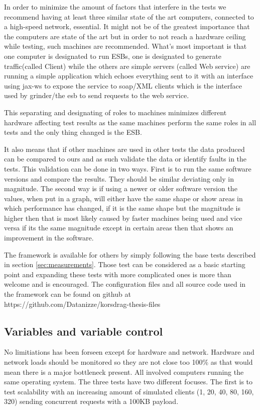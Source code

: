 In order to minimize the amount of factors that interfere in the tests we recommend having at least three similar state of the art computers, connected to a high-speed network, essential.
It might not be of the greatest importance that the computers are state of the art but in order to not reach a hardware ceiling while testing, such machines are recommended. 
What's most important is that one computer is designated to run ESBs, one is designated to generate traffic(called Client) while the others are simple servers (called Web service) are running a simple application which echoes everything sent to it with an interface using jax-ws to expose the service to soap/XML clients which is the interface used by grinder/the esb to send requests to the web service.

This separating and designating of roles to machines minimizes different hardware affecting test results as the same machines perform the same roles in all tests and the only thing changed is the ESB. 

It also means that if other machines are used in other tests the data produced can be compared to ours and as such validate the data or identify faults in the tests. 
This validation can be done in two ways. 
First is to run the same software versions and compare the results. 
They should be similar deviating only in magnitude. The second way is if using a newer or older software version the values, when put in a graph, will either have the same shape or show areas in which performance has changed, 
if it is the same shape but the magnitude is higher then that is most likely caused by faster machines being used and vice versa if its the same magnitude except in certain areas then that shows an improvement in the software.

The framework is available for others by simply following the base tests described in section \ref{sec:measurements}. Those test can be considered as a basic starting point and expanding these tests with more complicated ones is more than welcome and is encouraged.
The configuration files and all source code used in the framework can be found on github at https://github.com/Datanizze/korsdrag-thesis-files

\subsection{Variables and variable control}
No limitiations has been forseen except for hardware and network.
Hardware and network loads should be monitored so they are not close too 100\% as that would mean there is a major bottleneck present. 
All involved computers running the same operating system.
The three tests have two different focuses. The first is to test scalability with an increasing amount of simulated clients (1, 20, 40, 80, 160, 320) sending concurrent requests with a 100KB payload. 
